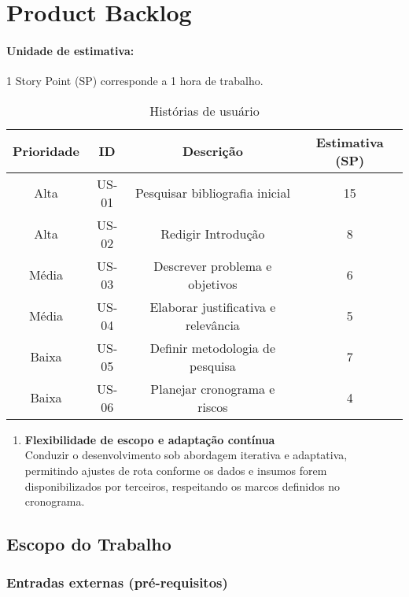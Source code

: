 \section{Product Backlog}

\paragraph{Unidade de estimativa:} 1 Story Point (SP) corresponde a 1 hora de trabalho.

\begin{table}[htbp]
  \centering
  \caption{Histórias de usuário}
  \label{tab:backlog}
  \begin{tabular}{cccc}
    \toprule
    Prioridade & ID & Descrição & Estimativa (SP) \\
    \midrule
    Alta  & US-01 & Pesquisar bibliografia inicial & 15 \\
    Alta  & US-02 & Redigir Introdução & 8 \\
    Média & US-03 & Descrever problema e objetivos & 6 \\
    Média & US-04 & Elaborar justificativa e relevância & 5 \\
    Baixa & US-05 & Definir metodologia de pesquisa & 7 \\
    Baixa & US-06 & Planejar cronograma e riscos & 4 \\
    \bottomrule
  \end{tabular}
\end{table}

\begin{enumerate}[leftmargin=*, label=\arabic*.]
  \item \textbf{Flexibilidade de escopo e adaptação contínua}\\
        Conduzir o desenvolvimento sob abordagem iterativa e adaptativa,
        permitindo ajustes de rota conforme os dados e insumos forem
        disponibilizados por terceiros, respeitando os marcos definidos no
        cronograma.
\end{enumerate}

\subsection{Escopo do Trabalho}\label{escopo-do-trabalho}

\subsubsection{Entradas externas (pré-requisitos)}\label{entradas-externas-prerequisitos}

